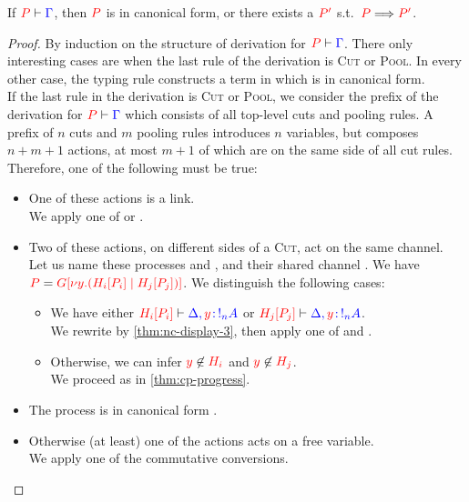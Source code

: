 \begin{theorem}[Progress]\label{thm:nc-progress}
  If $\seq[{ P }]{ \Gamma }$, then $\tm{P}$ is in canonical form, or there
  exists a $\tm{P'}$ s.t.\ $\reducesto{P}{P'}$.
\end{theorem}
\begin{proof}
  By induction on the structure of derivation for $\seq[{ P }]{ \Gamma }$.
  There only interesting cases are when the last rule of the derivation is
  \textsc{Cut} or \textsc{Pool}. In every other case, the typing rule constructs
  a term in which is in canonical form. 
  \\
  If the last rule in the derivation is \textsc{Cut} or \textsc{Pool}, we
  consider the prefix of the derivation for $\seq[{ P }]{ \Gamma}$ which
  consists of all top-level cuts and pooling rules. A prefix of $n$ cuts and $m$
  pooling rules introduces $n$ variables, but composes $n+m+1$ actions, at most
  $m+1$ of which are on the same side of all cut rules.
  Therefore, one of the following must be true:
  \begin{itemize}
  \item
    One of these actions is a link.
    \\
    We apply one of  or .
  \item
    Two of these actions, on different sides of a \textsc{Cut}, act on the same channel.
    \\
    Let us name these processes  and , and their shared channel
    . We have 
    $\tm{P} = \tm{\cpPlug{G}{\cpCut{y}{\cpPlug{H_i}{P_i}}{\cpPlug{H_j}{P_j}}}}$.
    We distinguish the following cases:
    \begin{itemize}
    \item
      We have either
      $\seq[{ \cpPlug{H_i}{P_i}}]{ \Delta, \tmty{y}{\take[n]{A}} }$ or
      $\seq[{ \cpPlug{H_j}{P_j} }]{\Delta, \tmty{y}{\take[n]{A}} }$.
      \\
      We rewrite by \cref{thm:nc-display-3}, then apply one of  and .
    \item
      Otherwise, we can infer $\notFreeIn{y}{H_i}$ and $\notFreeIn{y}{H_j}$.
      \\
      We proceed as in \cref{thm:cp-progress}. 
    \end{itemize}
  \item
    The process is in canonical form .
  \item
    Otherwise (at least) one of the actions acts on a free variable.
    \\
    We apply one of the commutative conversions.
  \end{itemize}
\end{proof}
